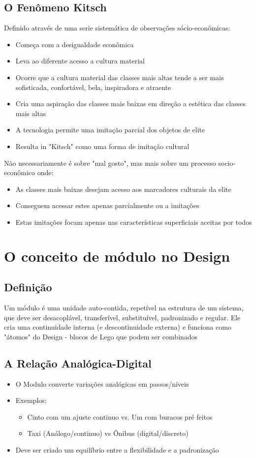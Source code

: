 \documentclass{article}
\begin{document}
\subsection{O Fenômeno Kitsch}
Definido através de uma serie sistemática de observações sócio-econômicas:
\begin{itemize}
    \item Começa com a desigualdade econômica
    \item Leva ao diferente acesso a cultura material
    \item Ocorre que a cultura material das classes mais altas tende a ser mais sofisticada, confortável, bela, inspiradora e atraente
    \item Cria uma aspiração das classes mais baixas em direção a estética das classes mais altas
    \item A tecnologia permite uma imitação parcial dos objetos de elite
    \item Resulta in "Kitsch" como uma forma de imitação cultural
\end{itemize}
Não necessariamente é sobre "mal gosto", mas mais sobre um processo socio-econômico onde:
\begin{itemize}
    \item As classes mais baixas desejam acesso aos marcadores culturais da elite
    \item Conseguem acessar estes apenas parcialmente ou a imitações
    \item Estas imitações focam apenas nas características superficiais aceitas por todos
\end{itemize}
\newpage
\section{O conceito de módulo no Design}
\subsection{Definição}
Um módulo é uma unidade auto-contida, repetível na estrutura de um sistema, que deve ser desacoplável, transferível, substituível, padronizado e regular. Ele cria uma continuidade interna (e descontinuidade externa) e funciona como "átomos" do Design - blocos de Lego que podem ser combinados
\subsection{A Relação Analógica-Digital}
\begin{itemize}
    \item O Modulo converte variações analógicas em passos/níveis
    \item Exemplos:
    \begin{itemize}
        \item Cinto com um ajuste continuo vs. Um com buracos pré feitos
        \item Taxi (Análogo/continuo) vs Ônibus (digital/discreto)
    \end{itemize}
    \item Deve ser criado um equilíbrio entre a flexibilidade e a padronização
\end{itemize}
\end{document}
